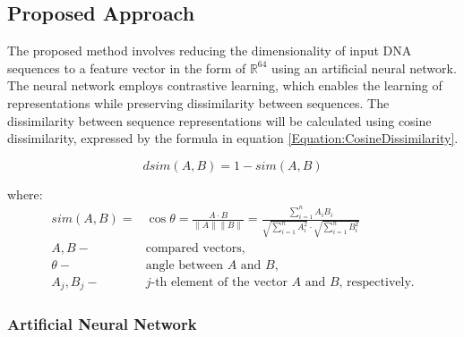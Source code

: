 \documentclass[pdflatex,sn-vancouver-num]{sn-jnl}%
\begin{document}


    \subsection{ Proposed Approach}

    The proposed method involves reducing the dimensionality of input DNA sequences to a feature vector in the form of $\mathbb{R}^{64}$ using an artificial neural network.
    The neural network employs contrastive learning, which enables the learning of representations while preserving dissimilarity between sequences.
    The dissimilarity between sequence representations will be calculated using cosine dissimilarity, expressed by the formula in equation \eqref{Equation:CosineDissimilarity}.

            \begin{equation}
                dsim(A, B) = 1 - sim(A, B)
                \label{Equation:CosineDissimilarity}
            \end{equation}

            where:
            \begin{align*}
                sim(A, B) =& \cos{\theta} = \frac{A \cdot B}{\|A\| \|B\|} = \frac{
                    \sum^{n}_{i = 1}A_i B_i
                }{
                    \sqrt{
                        \sum^{n}_{i = 1}A_i^2
                    }
                    \cdot
                    \sqrt{
                        \sum^{n}_{i = 1}B_i^2
                    }
                } \\
                A, B -& \text{compared vectors,} \\
                \theta -& \text{angle between $A$ and $B$,} \\
                A_j, B_j -& \text{$j$-th element of the vector $A$ and $B$, respectively.}
            \end{align*}

            \subsubsection{Artificial Neural Network}
\end{document}
